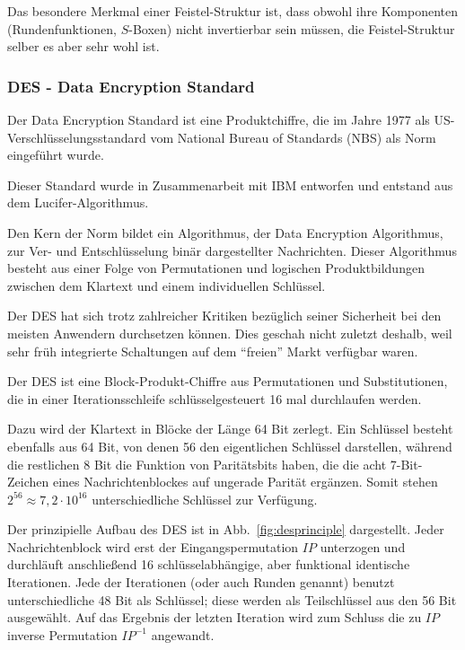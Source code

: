 
Das besondere Merkmal einer Feistel-Struktur ist, dass obwohl ihre Komponenten (Rundenfunktionen, $S$-Boxen) nicht invertierbar sein müssen, die Feistel-Struktur selber es aber sehr wohl ist.

\subsubsection{DES - Data Encryption Standard}
\label{sssec:des}
Der Data Encryption Standard ist eine Produktchiffre, die im Jahre 1977 als US-Ver\-schlüs\-sel\-ungs\-stan\-dard vom National Bureau of Standards (NBS) als
Norm eingeführt wurde.

Dieser Standard wurde in Zusammenarbeit mit IBM entworfen und entstand aus dem Lucifer-Algorithmus.

Den Kern der Norm bildet ein Algorithmus, der Data Encryption Algorithmus, zur Ver- und Entschlüsselung binär dargestellter Nachrichten. Dieser Algorithmus
besteht aus einer Folge von Permutationen und logischen Produktbildungen zwischen dem Klartext und einem individuellen Schlüssel.

Der DES hat sich trotz zahlreicher Kritiken bezüglich seiner Sicherheit bei den meisten Anwendern durchsetzen können. Dies geschah nicht zuletzt deshalb, weil
sehr früh integrierte Schaltungen auf dem "`freien"' Markt verfügbar waren.

Der DES ist eine Block-Produkt-Chiffre aus Permutationen und Substitutionen, die in einer Iterationsschleife schlüsselgesteuert 16 mal durchlaufen werden.

Dazu wird der Klartext in Blöcke der Länge 64 Bit zerlegt. Ein Schlüssel besteht ebenfalls aus 64 Bit, von denen 56 den eigentlichen Schlüssel darstellen,
während die restlichen 8 Bit die Funktion von Paritätsbits haben, die die acht 7-Bit-Zeichen eines Nachrichtenblockes auf ungerade Parität ergänzen. Somit
stehen $2^{56}\approx 7,2\cdot 10^{16}$ unterschiedliche Schlüssel zur Verfügung.

Der prinzipielle Aufbau des DES ist in Abb.~\ref{fig:desprinciple} dargestellt. Jeder Nachrichtenblock wird erst der Eingangspermutation $IP$ unterzogen und
durchläuft anschließend 16 schlüsselabhängige, aber funktional identische Iterationen. Jede der Iterationen (oder auch Runden genannt) benutzt unterschiedliche
48 Bit als Schlüssel; diese werden als Teilschlüssel aus den 56 Bit ausgewählt. Auf das Ergebnis der letzten Iteration wird zum Schluss die zu $IP$
inverse Permutation $IP^{-1}$ angewandt.

